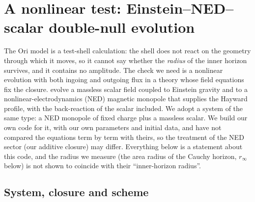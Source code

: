 \documentclass[11pt]{article}
\begin{document}
\section{A nonlinear test: Einstein--NED--scalar double-null evolution}
\label{sec:nonlinear}

The Ori model is a test-shell calculation: the shell does not react on the geometry through which it moves, so it cannot say whether the \emph{radius} of the inner horizon survives, and it contains no amplitude. The check we need is a nonlinear evolution with both ingoing and outgoing flux in a theory whose field equations fix the closure. \citet{ShaoEtAl2025} evolve a massless scalar field coupled to Einstein gravity and to a nonlinear-electrodynamics (NED) magnetic monopole that supplies the Hayward profile, with the back-reaction of the scalar included. We adopt a system of the same type: a NED monopole of fixed charge plus a massless scalar. We build our own code for it, with our own parameters and initial data, and have not compared the equations term by term with theirs, so the treatment of the NED sector (our additive closure) may differ. Everything below is a statement about this code, and the radius we measure (the area radius of the Cauchy horizon, $r_\infty$ below) is not shown to coincide with their ``inner-horizon radius''.

\subsection{System, closure and scheme}
\label{sec:nlsetup}
\end{document}
